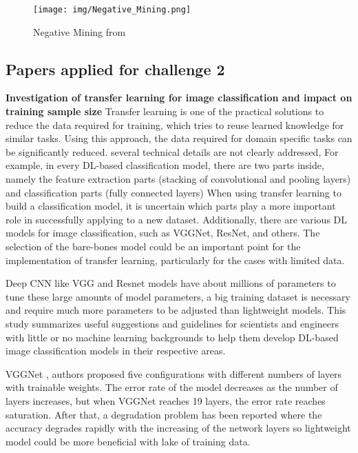 \documentclass[10pt,twocolumn,letterpaper]{article}
\begin{document}
\begin{figure*}[h!]
    \centering
      \texttt{[image: img/Negative\_Mining.png]}
      \caption{Negative Mining from \cite{kay19_dml_survey}}
      \label{figure:negative_mining}
    \end{figure*}
\newline

\subsection{Papers applied for challenge 2} 
\textbf{Investigation of transfer learning for image classification and impact on
training sample size
}\cite{transfer-learning}
Transfer learning is one of the practical solutions to reduce the data required for training, which tries to reuse learned knowledge for similar tasks. Using this approach, the data required for domain specific tasks can be significantly reduced. several technical details are not clearly addressed, For example, in every DL-based classification model, there are two parts inside, namely the feature extraction parts (stacking of convolutional and pooling layers) and classification parts (fully connected layers) When using transfer learning to build a classification model, it is uncertain which parts play a more important role in successfully applying to a new dataset. Additionally, there are various DL models for image classification, such as VGGNet, ResNet, and others. The selection of the bare-bones model could be an important point for the implementation of transfer learning, particularly for the cases with limited data. 

Deep CNN like VGG and Resnet models have about millions of parameters to tune these large amounts of model parameters, a big training dataset is necessary and require much more parameters to be adjusted than lightweight models. This study summarizes useful suggestions and guidelines for scientists and engineers with little or no machine learning backgrounds to help them develop DL-based image classification models in their respective areas.

VGGNet \cite{vgg16}, authors proposed five configurations with different numbers of layers with trainable weights. The error rate of the model decreases as the number of layers increases, but when VGGNet reaches 19 layers, the error rate reaches saturation. After that, a degradation problem has been reported where the accuracy degrades rapidly with the increasing of the network layers so lightweight model could be more beneficial with lake of training data.
\end{document}
